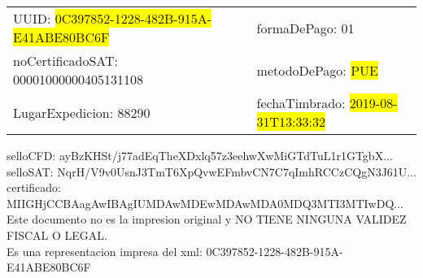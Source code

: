 \documentclass{article}
\begin{document}
\begin{tabular}{p{11cm}p{1cm}p{8cm}}
\bigskip
UUID: \colorbox{yellow}{ 0C397852-1228-482B-915A-E41ABE80BC6F } & & formaDePago: 01\\

noCertificadoSAT: 00001000000405131108 & & metodoDePago: \colorbox{yellow}{ PUE }\\

LugarExpedicion: 88290 & & fechaTimbrado: \colorbox{yellow}{ 2019-08-31T13:33:32 } \\
\end{tabular}

\bigskip
selloCFD: ayBzKHSt/j77adEqTheXDxlq57z3eehwXwMiGTdTuL1r1GTgbX... \\
selloSAT: NqrH/V9v0UsnJ3TmT6XpQvwEFmbvCN7C7qImhRCCzCQgN3J61U... \\

certificado: MIIGHjCCBAagAwIBAgIUMDAwMDEwMDAwMDA0MDQ3MTI3MTIwDQ...\bigskip\bigskip\bigskip\bigskip\bigskip\bigskip
\\Este documento no es la impresion original y NO TIENE NINGUNA VALIDEZ FISCAL O LEGAL. \\
 Es una representacion impresa del xml:  0C397852-1228-482B-915A-E41ABE80BC6F \\
\end{document}

